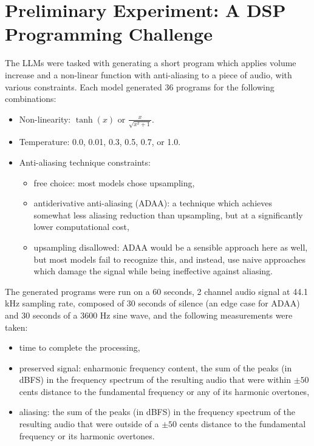 \documentclass[noindent,nohyp,parspace,titlepage,twoside,12pt]{article}
\begin{document}
\clearpage

  \section{Preliminary Experiment: A DSP Programming Challenge}

    The LLMs were tasked with generating a short program which applies volume
    increase and a non-linear function with anti-aliasing to a piece of audio,
    with various constraints. Each model generated 36 programs for the
    following combinations:

    \begin{itemize}
      \item Non-linearity: $\tanh(x)$ or $\frac{x}{\sqrt{x^2 + 1}}$.
      \item Temperature: 0.0, 0.01, 0.3, 0.5, 0.7, or 1.0.
      \item Anti-aliasing technique constraints:
            \begin{itemize}
              \item free choice: most models chose upsampling,
              \item antiderivative anti-aliasing \cite{adaa} (ADAA): a
                    technique which achieves somewhat less aliasing reduction
                    than upsampling, but at a significantly lower
                    computational cost,
              \item upsampling disallowed: ADAA would be a sensible approach
                    here as well, but most models fail to recognize this, and
                    instead, use naive approaches which damage the signal
                    while being ineffective against aliasing.
            \end{itemize}
    \end{itemize}

    The generated programs were run on a 60 seconds, 2 channel audio signal at
    44.1 kHz sampling rate, composed of 30 seconds of silence (an edge case
    for ADAA) and 30 seconds of a 3600 Hz sine wave, and the following
    measurements were taken:

    \begin{itemize}
      \item time to complete the processing,
      \item preserved signal: enharmonic frequency content, the sum of the
            peaks (in dBFS) in the frequency spectrum of the resulting audio
            that were within $\pm50$ cents distance to the fundamental
            frequency or any of its harmonic overtones,
      \item aliasing: the sum of the peaks (in dBFS) in the frequency
            spectrum of the resulting audio that were outside of a $\pm50$
            cents distance to the fundamental frequency or its harmonic
            overtones.
    \end{itemize}
\end{document}
